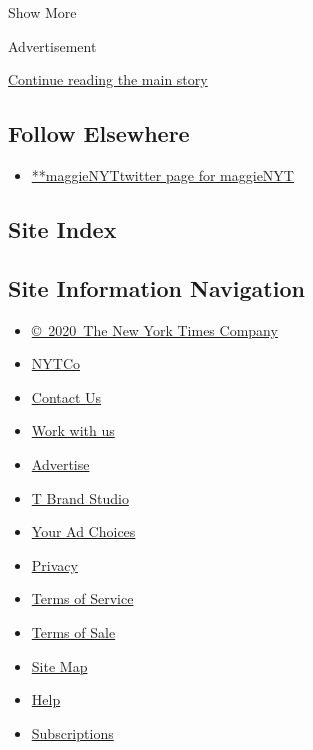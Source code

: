 Show More

Advertisement

\protect\hyperlink{after-mid2}{Continue reading the main story}

\hypertarget{follow-elsewhere}{%
\subsection{Follow Elsewhere}\label{follow-elsewhere}}

\begin{itemize}
\tightlist
\item
  \href{https://twitter.com/maggieNYT}{**maggieNYTtwitter page for
  maggieNYT}
\end{itemize}

\hypertarget{site-index}{%
\subsection{Site Index}\label{site-index}}

\hypertarget{site-information-navigation}{%
\subsection{Site Information
Navigation}\label{site-information-navigation}}

\begin{itemize}
\tightlist
\item
  \href{https://help.nytimes.com/hc/en-us/articles/115014792127-Copyright-notice}{©~2020~The
  New York Times Company}
\end{itemize}

\begin{itemize}
\tightlist
\item
  \href{https://www.nytco.com/}{NYTCo}
\item
  \href{https://help.nytimes.com/hc/en-us/articles/115015385887-Contact-Us}{Contact
  Us}
\item
  \href{https://www.nytco.com/careers/}{Work with us}
\item
  \href{https://nytmediakit.com/}{Advertise}
\item
  \href{http://www.tbrandstudio.com/}{T Brand Studio}
\item
  \href{https://www.nytimes.com/privacy/cookie-policy\#how-do-i-manage-trackers}{Your
  Ad Choices}
\item
  \href{https://www.nytimes.com/privacy}{Privacy}
\item
  \href{https://help.nytimes.com/hc/en-us/articles/115014893428-Terms-of-service}{Terms
  of Service}
\item
  \href{https://help.nytimes.com/hc/en-us/articles/115014893968-Terms-of-sale}{Terms
  of Sale}
\item
  \href{https://spiderbites.nytimes.com}{Site Map}
\item
  \href{https://help.nytimes.com/hc/en-us}{Help}
\item
  \href{https://www.nytimes.com/subscription?campaignId=37WXW}{Subscriptions}
\end{itemize}
